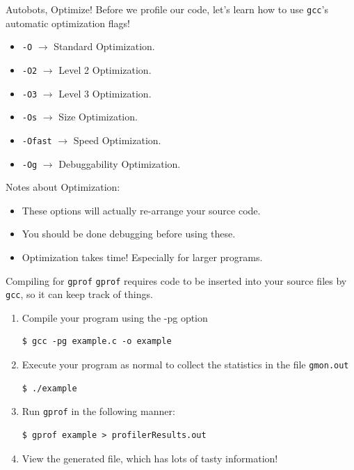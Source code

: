 \documentclass[11pt]{beamer}
\begin{document}
\begin{frame}{Autobots, Optimize!}
Before we profile our code, let's learn how to use \texttt{gcc}'s automatic optimization flags! 
\begin{itemize}
\item \texttt{-O} $\rightarrow$ Standard Optimization.
\item \texttt{-O2} $\rightarrow$ Level 2 Optimization.
\item \texttt{-O3} $\rightarrow$ Level 3 Optimization.
\item \texttt{-Os} $\rightarrow$ Size Optimization.
\item \texttt{-Ofast} $\rightarrow$ Speed Optimization. 
\item \texttt{-Og} $\rightarrow$ Debuggability Optimization.
\end{itemize}
Notes about Optimization:
\begin{itemize}
\item These options will actually re-arrange your source code.
\item You should be done debugging before using these.
\item Optimization takes time!  Especially for larger programs.
\end{itemize}
\end{frame}

\begin{frame}[fragile=singleslide]{Compiling for \texttt{gprof}}
\texttt{gprof} requires code to be inserted into your source files by \texttt{gcc}, so it can keep track of things.  
\begin{enumerate}
\item Compile your program using the -pg option
\begin{lstlisting}[style=terminal]
$ gcc -pg example.c -o example
\end{lstlisting}
\item Execute your program as normal to collect the statistics in the file \texttt{gmon.out}
\begin{lstlisting}[style=terminal]
$ ./example
\end{lstlisting}
\item Run \texttt{gprof} in the following manner:
\begin{lstlisting}[style=terminal]
$ gprof example > profilerResults.out
\end{lstlisting}
\item View the generated file, which has lots of tasty information! 
\end{enumerate}
\end{frame}
\end{document}
